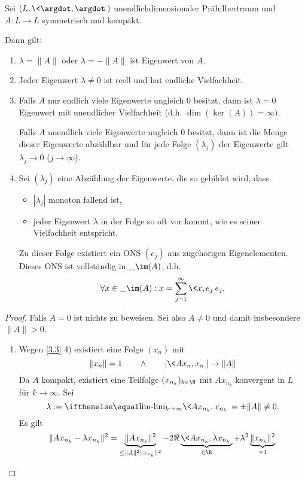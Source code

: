 \begin{st} \label{3.5}
	Sei $(L, \<\argdot,\argdot\>)$ unendlichdimensionaler Prähilbertraum und $A: L \to L$ symmetrisch und kompakt.

	Dann gilt:
	\begin{enumerate}[1)]
		\item
			$\lambda = \|A \|$ oder $\lambda = - \|A\|$ ist Eigenwert von $A$.
		\item
			Jeder Eigenwert $\lambda \neq 0$ ist reell und hat endliche Vielfachheit.
		\item
			Falls $A$ nur endlich viele Eigenwerte ungleich $0$ besitzt, dann ist $\lambda = 0$ Eigenwert mit unendlicher Vielfachheit (d.h. $\dim (\ker (A)) = \infty)$.

			Falls $A$ unendlich viele Eigenwerte ungleich $0$ besitzt, dann ist die Menge dieser Eigenwerte abzählbar und für jede Folge $(\lambda_j)$ der Eigenwerte gilt $\lambda_j \to 0$ ($j \to \infty$).
		\item
			Sei $(\lambda_j)$ eine Abzählung der Eigenwerte, die so gebildet wird, dass
			\begin{itemize}
				\item
					$|\lambda_j|$ monoton fallend ist,
				\item
					jeder Eigenwert $\lambda$ in der Folge so oft vor kommt, wie es seiner Vielfachheit entspricht.
			\end{itemize}
			Zu dieser Folge existiert ein ONS $(e_j)$ aus zugehörigen Eigenelementen.
			Dieses ONS ist vollständig in $\_{\im (A)}$, d.h.
			\[
				\forall x \in \_{\im(A)} : x = \sum_{j=1}^\infty \<x,e_j\> e_j.
			\]
	\end{enumerate}
	\begin{proof}
		Falls $A = 0$ ist nichts zu beweisen.
		Sei also $A \neq 0$ und damit insbesondere $\|A\| > 0$.
		\begin{enumerate}[1)]
			\item
				Wegen \ref{3.3} 4) existiert eine Folge $(x_n)$ mit
				\[
					\|x_n\| = 1 \qquad \land \qquad |\<Ax_n,x_n\>| \to \|A\|
				\]
				Da $A$ kompakt, existiert eine Teilfolge $(x_{n_k})_{k\in \N}$ mit $Ax_{n_k}$ konvergent in $L$ für $k \to \infty$.
				Sei
				\[
					\lambda := \lim_{k\to\infty} \<Ax_{n_k},x_{n_k}\> = \pm \|A\| \neq 0.
				\]
				Es gilt
				\begin{align*}
					\|Ax_{n_k} - \lambda x_{n_k}\|^2
					&= \underbrace{\|Ax_{n_k} \|^2}_{\le \|A\|^2 \|x_{n_k}\|^2} - 2 \Re \underbrace{\< Ax_{n_k}, \lambda x_{n_k} \>}_{\in \R} + \lambda^2 \underbrace{\|x_{n_k}\|^2}_{=1} \\

\end{align*}
\end{enumerate}
\end{proof}
\end{st}
